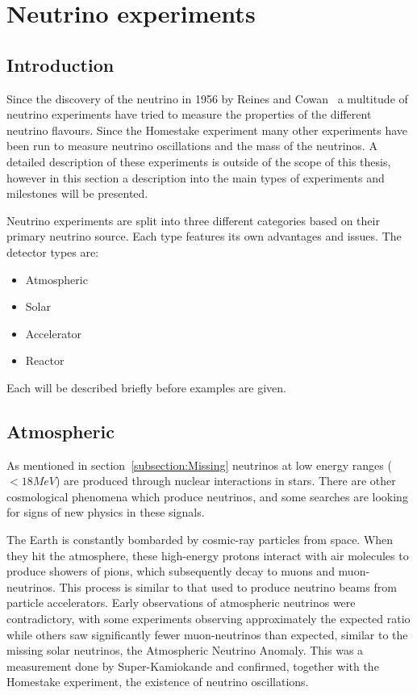 \chapter{Neutrino  experiments}
\label{c:expIntro}

\section{Introduction}
Since the discovery of the neutrino in 1956 by Reines and Cowan~\cite{6Reines} a multitude of neutrino experiments have tried to measure the properties of the different neutrino flavours. Since the Homestake experiment many other experiments have been run to measure neutrino oscillations and the mass of the neutrinos. A detailed description of these experiments is outside of the scope of this thesis, however in this section a description into the main types of experiments and milestones will be presented.

Neutrino experiments are split into three different categories based on their primary neutrino source. Each type features its own advantages and issues.
The detector types are:
\begin{itemize}
\item Atmospheric
\item Solar
\item Accelerator
\item Reactor
\end{itemize}
Each will be described briefly before examples are given.

\pagebreak
\newpage
\section{Atmospheric}

As mentioned in section~\ref{subsection:Missing} neutrinos at low energy ranges ($<18 MeV$) are produced through nuclear interactions in stars. There are other cosmological phenomena which produce neutrinos, and some searches are looking for signs of new physics in these signals. 

The Earth is constantly bombarded by cosmic-ray particles from space. When they hit the atmosphere, these high-energy protons interact with air molecules to produce showers of pions, which subsequently decay to muons and muon-neutrinos. This process is similar to that used to produce neutrino beams from particle accelerators. Early observations of atmospheric neutrinos were contradictory, with some experiments observing approximately the expected ratio while others saw significantly fewer muon-neutrinos than expected, similar to the missing solar neutrinos, the Atmospheric Neutrino Anomaly. This was a measurement done by Super-Kamiokande and confirmed, together with the Homestake experiment, the existence of neutrino oscillations.

